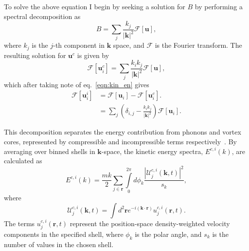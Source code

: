 To solve the above equation I begin by seeking a solution for $B$ by performing a spectral decomposition as
\begin{equation}
    B = \displaystyle\sum\limits_{j} \frac{k_j}{|\mathbf{k}|^2}\mathscr{F}[\mathbf{u}],
\end{equation}
where $k_j$ is the $j$-th component in $\mathbf{k}$ space, and $\mathscr{F}$ is the Fourier transform. The resulting solution for $\mathbf{u}^c$ is given by
\begin{equation}
    \mathscr{F}[\mathbf{u}_i^c] = \displaystyle\sum\limits_{j} \frac{k_i k_j}{|\mathbf{k}|^2} \mathscr{F}[\mathbf{u}],
\end{equation}
which after taking note of eq.~\ref{eqn:kin_en} gives
\begin{align}
    \mathscr{F}[\mathbf{u}_i^i] &= \mathscr{F}[\mathbf{u}_i] - \mathscr{F}[\mathbf{u}_i^c]. \\
    &= \displaystyle\sum\limits_{j}\left(\delta_{i,j} - \frac{k_ik_j}{|\mathbf{k}|^2}\right)\mathscr{F}[\mathbf{u}_i]. \nonumber
\end{align}

This decomposition separates the energy contribution from phonons and vortex cores, represented by compressible and incompressible terms respectively~\cite{CT:Horng_pra_2009}. By averaging over binned shells in $\mathbf{k}$-space, the kinetic energy spectra, $E^{c,i}(k)$, are calculated as~\cite{CT:Bradley_prx_2012}
\begin{equation}
	E^{c,i}(k) = \frac{mk}{2}\sum\limits_{j\in\mathbf{r}} \int\limits_{0}^{2\pi}d\phi_k \frac{ |\mathcal{U}_j^{c,i}(\mathbf{k},t) |^2}{s_k},
\end{equation}
where
\begin{equation}
	\mathcal{U}_j^{c,i}(\mathbf{k},t) = \int d^2 \mathbf{r} e^{-i(\mathbf{k}\cdot\mathbf{r})} u_j^{c,i}(\mathbf{r},t).
\end{equation}
The terms $u_j^{c,i}(\mathbf{r},t)$ represent the position-space density-weighted velocity components in the specified shell, where $\phi_k$ is the polar angle, and $s_k$ is the number of values in the chosen shell.
